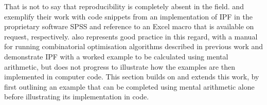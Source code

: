 \documentclass[a4paper,10pt]{article}
\begin{document}
That is not to say that reproducibility is completely absent in the field.
\citet{Simpson2005} and \citet{Norman1999a}
exemplify their work with code snippets from an implementation
of IPF in the proprietary software SPSS and reference to
an Excel macro that is available on request, respectively.
\citet{Williamson2007} also represents
good practice in this regard, with a manual for running 
combinatorial optimisation algorithms described in previous work and
\citep{Ballas2005c} demonstrate IPF with a worked example
to be calculated using mental arithmetic, but does not progress to
illustrate how the examples are then implemented in computer code.
This section builds on and extends this work, by first outlining an example that
can be completed using mental arithmetic alone before illustrating its
implementation in code. %




\end{document}
